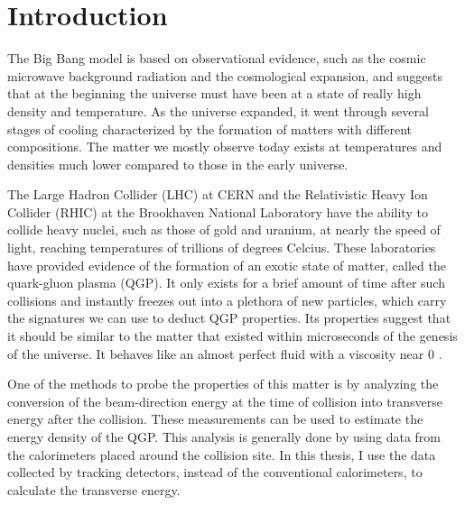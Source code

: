 \chapter{Introduction} \label{ch:introduction}

The Big Bang model is based on observational evidence, such as the cosmic microwave background radiation and the cosmological expansion, and suggests that at the beginning the universe must have been at a state of really high density and temperature. As the universe expanded, it went through several stages of cooling characterized by the formation of matters with different compositions. The matter we mostly observe today exists at temperatures and densities much lower compared to those in the early universe.

The Large Hadron Collider (LHC) at CERN and the Relativistic Heavy Ion Collider (RHIC) at the Brookhaven National Laboratory have the ability to collide heavy nuclei, such as those of gold and uranium, at nearly the speed of light, reaching temperatures of trillions of degrees Celcius. These laboratories have provided evidence of the formation of an exotic state of matter, called the quark-gluon plasma (QGP). It only exists for a brief amount of time after such collisions and instantly freezes out into a plethora of new particles, which carry the signatures we can use to deduct QGP properties. Its properties suggest that it should be similar to the matter that existed within microseconds of the genesis of the universe. It behaves like an almost perfect fluid with a viscosity near 0 \cite{RHIC white paper}.

One of the methods to probe the properties of this matter is by analyzing the conversion of the beam-direction energy at the time of collision into transverse energy after the collision. These measurements can be used to estimate the energy density of the QGP. This analysis is generally done by using data from the calorimeters placed around the collision site. In this thesis, I use the data collected by tracking detectors, instead of the conventional calorimeters, to calculate the transverse energy.

